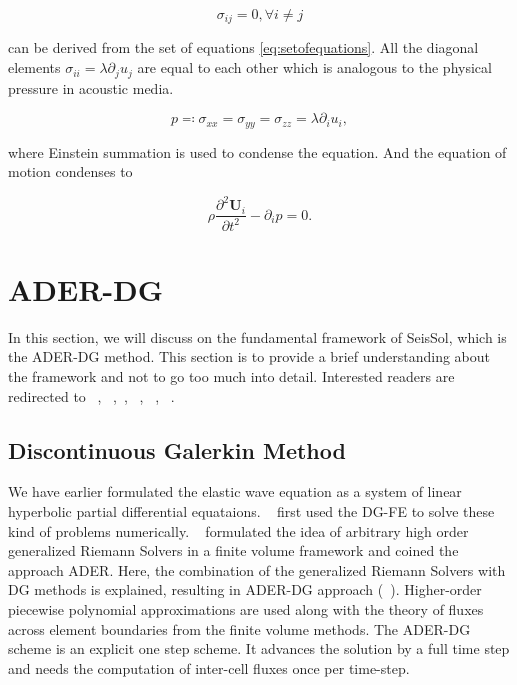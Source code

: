 \begin{equation}
    \sigma_{ij} = 0, \forall i \neq j
\end{equation}

can be derived from the set of equations \ref{eq:setofequations}. All the diagonal elements $\sigma_{ii} = \lambda \partial_j u_j$
are equal to each other which is analogous to the physical pressure in acoustic media. 

\begin{equation}
    p \eqcolon \sigma_{xx} = \sigma_{yy} = \sigma_{zz} = \lambda \partial_iu_i,
\end{equation}

where Einstein summation is used to condense the equation. And the equation of motion condenses to

\begin{equation}
    \rho \frac{\partial^2 \mathbf{U}_i}{\partial t^2} - \partial_i p = 0.
\end{equation}

\section{\ac{ADER}-\ac{DG}}\label{section:ADER-DG}

In this section, we will discuss on the fundamental framework of SeisSol, which is the \ac{ADER}-\ac{DG} method. This section is to provide
a brief understanding about the framework and not to go too much into detail. Interested readers are redirected to ~\parencite{martin}, ~\parencite{Toro2002},~\parencite{dumbser1}, ~\parencite{DUMBSER2005683}, ~\parencite{Toro2001}, ~\parencite{seissol}.

\subsection[Discontinuous Galerkin method]{Discontinuous Galerkin Method}\label{subsection:DG}

We have earlier formulated the elastic wave equation as a system of linear hyperbolic partial differential equataions. ~\parencite{osti_4491151}
first used the \ac{DG-FE} to solve these kind of problems numerically. ~\parencite{Toro2001} formulated the idea of arbitrary high order generalized
Riemann Solvers in a finite volume framework and coined the approach \ac{ADER}. Here, the combination of the generalized Riemann Solvers with \ac{DG}
methods is explained, resulting in \ac{ADER}-\ac{DG} approach (~\parencite{Dumbser2006}). Higher-order piecewise polynomial approximations are used
along with the theory of fluxes across element boundaries from the finite volume methods. The \ac{ADER}-\ac{DG} scheme is an explicit one step scheme.
It advances the solution by a full time step and needs the computation of inter-cell fluxes once per time-step. \\

